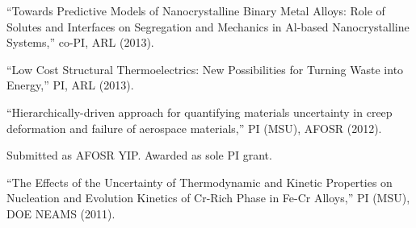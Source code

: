 \begin{list2}
\item ``Towards Predictive Models of Nanocrystalline Binary Metal Alloys: Role of Solutes and Interfaces on Segregation and Mechanics in Al-based Nanocrystalline Systems,'' co-PI, ARL (2013).
\item ``Low Cost Structural Thermoelectrics: New Possibilities for Turning Waste into Energy,'' PI, ARL (2013).
\item ``Hierarchically-driven approach for quantifying materials uncertainty in creep deformation and failure of aerospace materials,'' PI (MSU), AFOSR (2012).
\begin{list2}
\item Submitted as AFOSR YIP.  Awarded as sole PI grant.
\end{list2}
\item ``The Effects of the Uncertainty of Thermodynamic and Kinetic Properties on Nucleation and Evolution Kinetics of Cr-Rich Phase in Fe-Cr Alloys,'' PI (MSU), DOE NEAMS (2011).
\end{list2}
